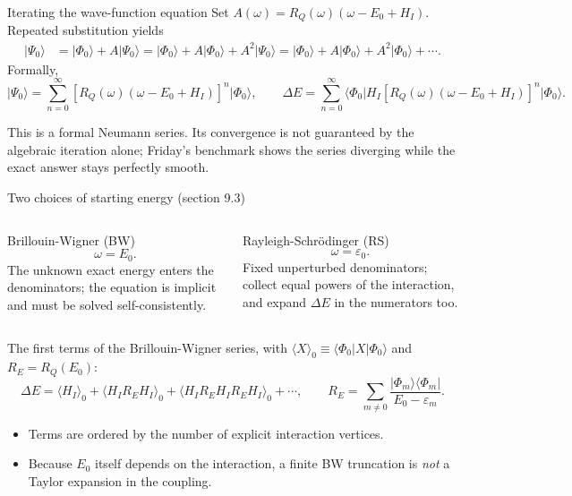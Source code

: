 \documentclass[aspectratio=169,10pt]{beamer}
\newcommand{\warnbox}[1]{%
  \begin{tcolorbox}[colback=palewarm,colframe=warm,title={\bfseries A trap to avoid}]
  #1
  \end{tcolorbox}}
\newcommand{\ket}[1]{\vert #1\rangle}
\newcommand{\bra}[1]{\langle #1\vert}
\newcommand{\mel}[3]{\langle #1\lvert #2\rvert #3\rangle}
\newcommand{\av}[1]{\langle #1\rangle_0}
\newcommand{\ph}{\Phi_0}
\newcommand{\Psizero}{\Psi_0}
\begin{document}
\begin{frame}{Iterating the wave-function equation}
Set \(A(\omega)=R_Q(\omega)(\omega-E_0+H_I)\). Repeated substitution yields
\begin{align*}
\ket{\Psizero}&=\ket{\ph}+A\ket{\Psizero}
=\ket{\ph}+A\ket{\ph}+A^2\ket{\Psizero}
=\ket{\ph}+A\ket{\ph}+A^2\ket{\ph}+\cdots.
\end{align*}
Formally,
\[
\boxed{\ket{\Psizero}=\sum_{n=0}^{\infty}
\left[R_Q(\omega)(\omega-E_0+H_I)\right]^n\ket{\ph},}
\qquad
\Delta E=\sum_{n=0}^{\infty}
\mel{\ph}{H_I\left[R_Q(\omega)(\omega-E_0+H_I)\right]^n}{\ph}.
\]
\warnbox{This is a formal Neumann series. Its convergence is not guaranteed by the algebraic iteration alone; Friday's benchmark shows the series diverging while the exact answer stays perfectly smooth.}
\end{frame}

\begin{frame}{Two choices of starting energy (section 9.3)}
\begin{columns}[T,onlytextwidth]
\begin{block}{Brillouin-Wigner (BW)}
\[\omega=E_0.\]
The unknown exact energy enters the denominators; the equation is implicit and must be solved self-consistently.
\end{block}
\begin{exampleblock}{Rayleigh-Schr\"odinger (RS)}
\[\omega=\varepsilon_0.\]
Fixed unperturbed denominators; collect equal powers of the interaction, and expand \(\Delta E\) in the numerators too.
\end{exampleblock}
\end{columns}
\vspace{0.8em}
The first terms of the Brillouin-Wigner series, with \(\av{X}\equiv\mel{\ph}{X}{\ph}\) and \(R_E=R_Q(E_0)\):
\[
\Delta E=\av{H_I}
+\av{H_I R_E H_I}
+\av{H_I R_E H_I R_E H_I}+\cdots ,
\qquad
R_E=\sum_{m\ne0}\frac{\ket{\Phi_m}\bra{\Phi_m}}{E_0-\varepsilon_m}.
\]
\begin{itemize}
\item Terms are ordered by the number of explicit interaction vertices.
\item Because \(E_0\) itself depends on the interaction, a finite BW truncation is \emph{not} a Taylor expansion in the coupling.
\end{itemize}
\end{frame}

\end{document}
